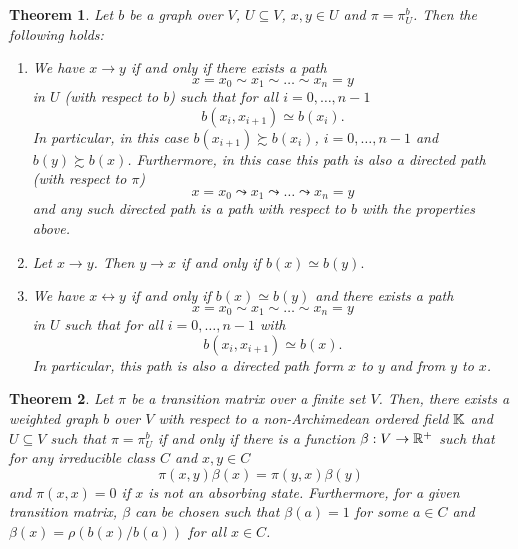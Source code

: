 \documentclass[10pt,a4paper]{amsart}
\newtheorem{theorem}{Theorem}
\newcommand{\prob}{\pi}
\newcommand{\rw}{\beta}
\newcommand{\subsV}{U}
\begin{document}
\begin{theorem}\label{thm::bxby}
Let $b$ be a  graph over $V$, $\subsV\subseteq V$, $x,y\in \subsV$ and $\pi=\pi_\subsV^{b}$. Then the following holds:
\begin{enumerate}[label=${(\alph*)}$]
\item We have 
$x\to y$ if and only if there exists a path $$ x=x_0\sim x_1\sim\dots \sim x_n=y $$ in  $\subsV$ (with respect to $ b $) such that for all $ i=0,\ldots,n-1 $
 $$ b(x_i,x_{i+1})\simeq b(x_i). $$
In particular, in this case 
${b(x_{i+1})\succsim b(x_i)}$, $ i=0,\ldots,n-1$
and ${b(y)}\succsim{b(x)}$.
Furthermore, in this case this path is also a directed path (with respect to $ \pi $)
$$
x=x_0\leadsto x_1\leadsto\dots \leadsto x_n=y
$$
and any such directed path is a path with respect to $ b $ with the properties above. 
\item
Let $x\to y$. Then $y\to x$ if and only if  $b(x)\simeq b(y).$


\item
 We have  $x\leftrightarrow y$ if and only if $b(x)\simeq b(y)$ and there exists a path  $$ x=x_0\sim x_1\sim\dots \sim x_n=y $$ in  $\subsV$  such that for all $ i=0,\ldots,n-1 $
with $$ b(x_i,x_{i+1})\simeq b(x). $$ 
In particular, this path is also a directed path form  $ x $ to $ y $ and from $ y $ to $ x $.
\end{enumerate}
\end{theorem}

\begin{theorem}\label{thm:finitevsdirected} Let $ \pi $ be a transition matrix over a finite set $ V $. Then, there exists a weighted graph $ b $ over $ V $ with respect to a non-Archimedean ordered field $\Bbb K$ and $\subsV\subseteq V$ such that $\pi=\pi_{U}^{b}$ if and only if  there is a function $\rw:V\to \Bbb R^+$ such that 
	for any irreducible class $C$ and  $x,y\in C$ 
	$$
	\prob(x,y)\rw(x)=\prob(y,x)\rw(y)
	$$
	and $ \pi(x,x)=0 $ if $ x $ is not an absorbing state.
	Furthermore, for a given transition matrix, $ \beta $ can be chosen such that $ \beta (a)=1 $ for some $ a\in C $ and $  \beta(x)=\rho (b(x)/b(a)) $ for all $ x\in C $.
\end{theorem}
\end{document}
